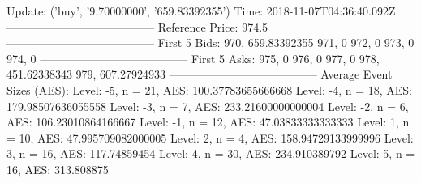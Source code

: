 Update: ('buy', '9.70000000', '659.83392355')
Time: 2018-11-07T04:36:40.092Z
---------------------------------------
Reference Price: 974.5
---------------------------------------
First 5 Bids: 
970, 659.83392355
971, 0
972, 0
973, 0
974, 0
---------------------------------------
First 5 Asks: 
975, 0
976, 0
977, 0
978, 451.62338343
979, 607.27924933
---------------------------------------
Average Event Sizes (AES):
Level: -5, n = 21, AES: 100.37783655666668
Level: -4, n = 18, AES: 179.98507636055558
Level: -3, n = 7, AES: 233.21600000000004
Level: -2, n = 6, AES: 106.23010864166667
Level: -1, n = 12, AES: 47.03833333333333
Level: 1, n = 10, AES: 47.995709082000005
Level: 2, n = 4, AES: 158.94729133999996
Level: 3, n = 16, AES: 117.74859454
Level: 4, n = 30, AES: 234.910389792
Level: 5, n = 16, AES: 313.808875
